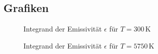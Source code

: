 \documentclass[10pt,a4paper]{article}
\begin{document}
\begin{appendix}
\section{Grafiken}

\begin{figure}[htbp!]
\centering

\caption{Integrand der Emissivität $\epsilon$ für $T=300\, \si{\kelvin}$}
\label{fig:integrand300}
\end{figure}

\begin{figure}[htbp!]
\centering

\caption{Integrand der Emissivität $\epsilon$ für $T=5750\, \si{\kelvin}$}
\label{fig:integrand5750}
\end{figure}

\end{appendix}
\end{document}
